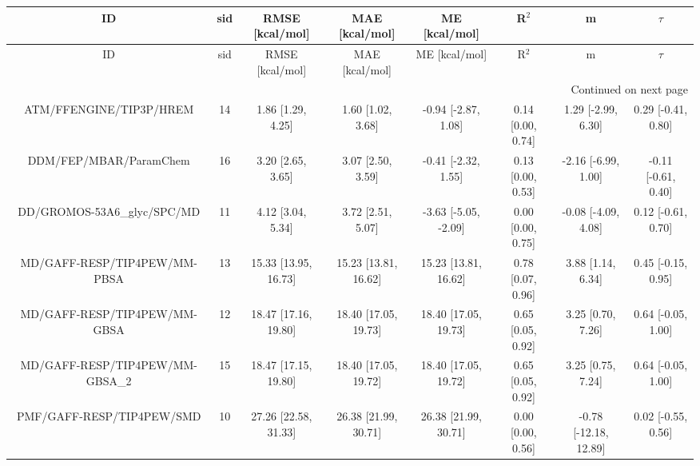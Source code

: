 \documentclass[8pt]{article}
\begin{document}
\begin{center}
\begin{footnotesize}
\begin{longtable}{|cccccccc|}
\toprule
                             ID & sid &      RMSE [kcal/mol] &       MAE [kcal/mol] &        ME [kcal/mol] &             R$^2$ &                     m &              $\tau$ \\
\midrule
\endfirsthead

\toprule
                             ID & sid &      RMSE [kcal/mol] &       MAE [kcal/mol] &        ME [kcal/mol] &             R$^2$ &                     m &              $\tau$ \\
\midrule
\endhead
\midrule
\multicolumn{8}{r}{{Continued on next page}} \\
\midrule
\endfoot

\bottomrule
\endlastfoot
        ATM/FFENGINE/TIP3P/HREM &  14 &    1.86 [1.29, 4.25] &    1.60 [1.02, 3.68] &  -0.94 [-2.87, 1.08] & 0.14 [0.00, 0.74] &    1.29 [-2.99, 6.30] &  0.29 [-0.41, 0.80] \\
         DDM/FEP/MBAR/ParamChem &  16 &    3.20 [2.65, 3.65] &    3.07 [2.50, 3.59] &  -0.41 [-2.32, 1.55] & 0.13 [0.00, 0.53] &   -2.16 [-6.99, 1.00] & -0.11 [-0.61, 0.40] \\
    DD/GROMOS-53A6\_glyc/SPC/MD &  11 &    4.12 [3.04, 5.34] &    3.72 [2.51, 5.07] & -3.63 [-5.05, -2.09] & 0.00 [0.00, 0.75] &   -0.08 [-4.09, 4.08] &  0.12 [-0.61, 0.70] \\
   MD/GAFF-RESP/TIP4PEW/MM-PBSA &  13 & 15.33 [13.95, 16.73] & 15.23 [13.81, 16.62] & 15.23 [13.81, 16.62] & 0.78 [0.07, 0.96] &     3.88 [1.14, 6.34] &  0.45 [-0.15, 0.95] \\
   MD/GAFF-RESP/TIP4PEW/MM-GBSA &  12 & 18.47 [17.16, 19.80] & 18.40 [17.05, 19.73] & 18.40 [17.05, 19.73] & 0.65 [0.05, 0.92] &     3.25 [0.70, 7.26] &  0.64 [-0.05, 1.00] \\
MD/GAFF-RESP/TIP4PEW/MM-GBSA\_2 &  15 & 18.47 [17.15, 19.80] & 18.40 [17.05, 19.72] & 18.40 [17.05, 19.72] & 0.65 [0.05, 0.92] &     3.25 [0.75, 7.24] &  0.64 [-0.05, 1.00] \\
      PMF/GAFF-RESP/TIP4PEW/SMD &  10 & 27.26 [22.58, 31.33] & 26.38 [21.99, 30.71] & 26.38 [21.99, 30.71] & 0.00 [0.00, 0.56] & -0.78 [-12.18, 12.89] &  0.02 [-0.55, 0.56] \\
\end{longtable}
\end{footnotesize}
\end{center}
\end{document}
